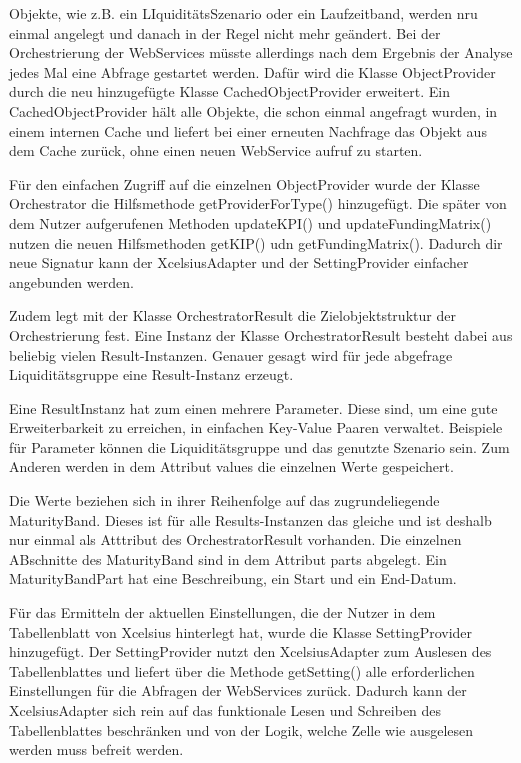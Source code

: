 Objekte, wie z.B. ein LIquiditätsSzenario oder ein Laufzeitband, werden nru einmal angelegt und danach in der Regel nicht mehr geändert. Bei der Orchestrierung der WebServices müsste allerdings nach dem Ergebnis der Analyse jedes Mal eine Abfrage gestartet werden. Dafür wird die Klasse ObjectProvider durch die neu hinzugefügte Klasse CachedObjectProvider erweitert. Ein CachedObjectProvider hält alle Objekte, die schon einmal angefragt wurden, in einem internen Cache und liefert bei einer erneuten Nachfrage das Objekt aus dem Cache zurück, ohne einen neuen WebService aufruf zu starten.

Für den einfachen Zugriff auf die einzelnen ObjectProvider wurde der Klasse Orchestrator die Hilfsmethode getProviderForType() hinzugefügt. Die später von dem Nutzer aufgerufenen Methoden updateKPI() und updateFundingMatrix() nutzen die neuen Hilfsmethoden getKIP() udn getFundingMatrix(). Dadurch dir neue Signatur kann der XcelsiusAdapter und der SettingProvider einfacher angebunden werden.

Zudem legt mit der Klasse OrchestratorResult die Zielobjektstruktur der Orchestrierung fest. Eine Instanz der Klasse OrchestratorResult besteht dabei aus beliebig vielen Result-Instanzen. Genauer gesagt wird für jede abgefrage Liquiditätsgruppe eine Result-Instanz erzeugt.

Eine ResultInstanz hat zum einen mehrere Parameter. Diese sind, um eine gute Erweiterbarkeit zu erreichen, in einfachen Key-Value Paaren verwaltet. Beispiele für Parameter können die Liquiditätsgruppe und das genutzte Szenario sein. Zum Anderen werden in dem Attribut values die einzelnen Werte gespeichert.

Die Werte beziehen sich in ihrer Reihenfolge auf das zugrundeliegende MaturityBand. Dieses ist für alle Results-Instanzen das gleiche und ist deshalb nur einmal als Atttribut des OrchestratorResult vorhanden. Die einzelnen ABschnitte des MaturityBand sind in dem Attribut parts abgelegt. Ein MaturityBandPart hat eine Beschreibung, ein Start und ein End-Datum.

Für das Ermitteln der aktuellen Einstellungen, die der Nutzer in dem Tabellenblatt von Xcelsius hinterlegt hat, wurde die Klasse SettingProvider hinzugefügt. Der SettingProvider nutzt den XcelsiusAdapter zum Auslesen des Tabellenblattes und liefert über die Methode getSetting() alle erforderlichen Einstellungen für die Abfragen der WebServices zurück. Dadurch kann der XcelsiusAdapter sich rein auf das funktionale Lesen und Schreiben des Tabellenblattes beschränken und von der Logik, welche Zelle wie ausgelesen werden muss befreit werden.

